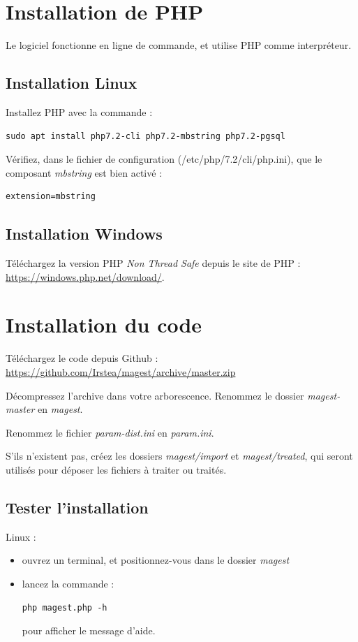 \documentclass[12pt,a4paper]{article}
\begin{document}
\section{Installation de PHP}
Le logiciel fonctionne en ligne de commande, et utilise PHP comme interpréteur.

\subsection{Installation Linux}
Installez PHP avec la commande :
\begin{lstlisting}
sudo apt install php7.2-cli php7.2-mbstring php7.2-pgsql
\end{lstlisting}

Vérifiez, dans le fichier de configuration (/etc/php/7.2/cli/php.ini), que le composant \textit{mbstring} est bien activé :
\begin{lstlisting}
extension=mbstring
\end{lstlisting}


\subsection{Installation Windows}
Téléchargez la version PHP \textit{Non Thread Safe} depuis le site de PHP : \href{https://windows.php.net/download/}{https://windows.php.net/download/}.

\section{Installation du code}
Téléchargez le code depuis Github : \href{https://github.com/Irstea/magest/archive/master.zip}{https://github.com/Irstea/magest/archive/master.zip}

Décompressez l'archive dans votre arborescence. Renommez le dossier \textit{magest-master} en \textit{magest}.

Renommez le fichier \textit{param-dist.ini} en \textit{param.ini}.

S'ils n'existent pas, créez les dossiers \textit{magest/import} et \textit{magest/treated}, qui seront utilisés pour déposer les fichiers à traiter ou traités.

\subsection{Tester l'installation}

Linux :
\begin{itemize}
\item ouvrez un terminal, et positionnez-vous dans le dossier \textit{magest}
\item lancez la commande :
\begin{lstlisting}
php magest.php -h
\end{lstlisting}
pour afficher le message d'aide.
\end{itemize}
\end{document}
